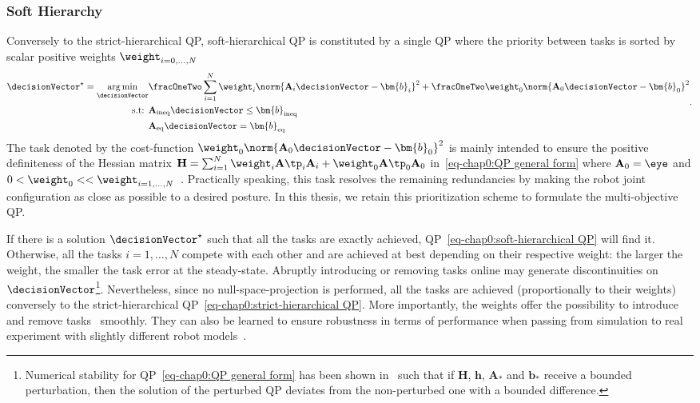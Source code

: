 \subsubsection{Soft Hierarchy}
Conversely to the strict-hierarchical QP, soft-hierarchical QP is constituted by a single QP where the priority between tasks is sorted by scalar positive weights $\weight_{i=0,\ldots,N}$~\cite{abe2007siggraph} 
\begin{align}\label{eq-chap0:soft-hierarchical QP}  
	\begin{split}
			\decisionVector^{\star}
 = \underset{\decisionVector}{\arg\min} &\fracOneTwo\sum_{i=1}^{N}\weight_i\norm{\mathbf{A}_i\decisionVector-\bm{b}_i}^2 +\fracOneTwo \weight_0\norm{\mathbf{A}_0\decisionVector-\bm{b}_0}^2 \\
		\text{s.t: } & \mathbf{A}_{{\rm ineq}}\decisionVector\leq\bm{b}_{{\rm ineq}} \\ 
		& \mathbf{A}_{{\rm eq}}\decisionVector=\bm{b}_{{\rm eq}}
	\end{split}.
\end{align}
The task denoted by the cost-function  $\weight_0\norm{\mathbf{A}_0\decisionVector-\bm{b}_0}^2$ is mainly intended to ensure the positive definiteness of the Hessian matrix $\mathbf{H} = \sum_{i=1}^{N}\weight_i\mathbf{A}\tp_i\mathbf{A}_i + \weight_0\mathbf{A}\tp_0\mathbf{A}_0$ in~\cref{eq-chap0:QP general form} where  $\mathbf{A}_0 = \eye$ and $0<\weight_0<< \weight_{i=1,\ldots,N}$~\cite[Lemma~2]{bouyarmane2018tac}. Practically speaking, this task resolves the remaining redundancies by making the  robot joint configuration as close as possible to a desired posture.  In this thesis, we retain this prioritization scheme to formulate the multi-objective QP.   

If there is a solution 	$\decisionVector^{\star}$ such that all the tasks are exactly achieved, QP~\cref{eq-chap0:soft-hierarchical QP} will find it. Otherwise,  all the tasks $i=1,\ldots,N$ compete with each other and are achieved at best depending on their respective weight: the larger the weight, the smaller the task error at the steady-state. Abruptly introducing or removing tasks online may generate discontinuities on $\decisionVector$\footnote{Numerical stability for QP~\cref{eq-chap0:QP general form} has been shown in~\cite[Proposition~9]{bouyarmane2018tac} such that if $\mathbf{H}$, $\bm{h}$, $\mathbf{A}_{*}$ and $\bm{b}_{*}$ receive a bounded perturbation, then the solution of the perturbed QP deviates from the non-perturbed one with a bounded difference. }. Nevertheless, since no null-space-projection is performed, all the tasks are achieved (proportionally to their weights) conversely to the strict-hierarchical QP~\cref{eq-chap0:strict-hierarchical QP}. 
More importantly, the weights offer the possibility to introduce and remove tasks~\cite{keith2011iros,salini2011icra} smoothly. They can also be learned to ensure robustness in terms of performance when passing from simulation to real experiment with slightly different robot models~\cite{charbonneau2018humanoids}. 

